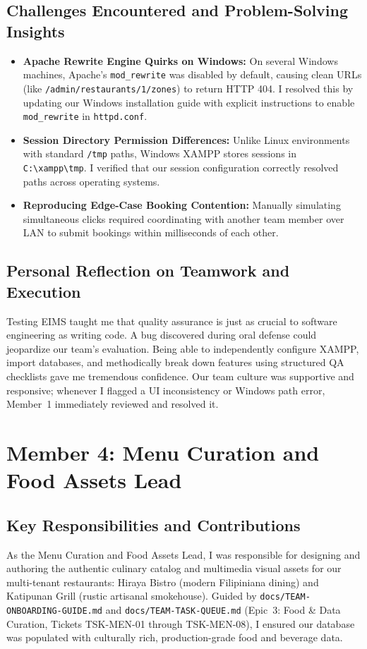 \subsection{Challenges Encountered and Problem-Solving Insights}
\begin{itemize}
    \item \textbf{Apache Rewrite Engine Quirks on Windows:} On several Windows machines, Apache's \texttt{mod\_rewrite} was disabled by default, causing clean URLs (like \texttt{/admin/restaurants/1/zones}) to return HTTP 404. I resolved this by updating our Windows installation guide with explicit instructions to enable \texttt{mod\_rewrite} in \texttt{httpd.conf}.
    \item \textbf{Session Directory Permission Differences:} Unlike Linux environments with standard \texttt{/tmp} paths, Windows XAMPP stores sessions in \texttt{C:\textbackslash xampp\textbackslash tmp}. I verified that our session configuration correctly resolved paths across operating systems.
    \item \textbf{Reproducing Edge-Case Booking Contention:} Manually simulating simultaneous clicks required coordinating with another team member over LAN to submit bookings within milliseconds of each other.
\end{itemize}

\subsection{Personal Reflection on Teamwork and Execution}
Testing EIMS taught me that quality assurance is just as crucial to software engineering as writing code. A bug discovered during oral defense could jeopardize our team's evaluation. Being able to independently configure XAMPP, import databases, and methodically break down features using structured QA checklists gave me tremendous confidence. Our team culture was supportive and responsive; whenever I flagged a UI inconsistency or Windows path error, Member~1 immediately reviewed and resolved it.

\newpage
\section{Member 4: Menu Curation and Food Assets Lead}
\label{sec:reflection_member_4}

\subsection{Key Responsibilities and Contributions}
As the Menu Curation and Food Assets Lead, I was responsible for designing and authoring the authentic culinary catalog and multimedia visual assets for our multi-tenant restaurants: Hiraya Bistro (modern Filipiniana dining) and Katipunan Grill (rustic artisanal smokehouse). Guided by \texttt{docs/TEAM-ONBOARDING-GUIDE.md} and \texttt{docs/TEAM-TASK-QUEUE.md} (Epic~3: Food \& Data Curation, Tickets TSK-MEN-01 through TSK-MEN-08), I ensured our database was populated with culturally rich, production-grade food and beverage data.

